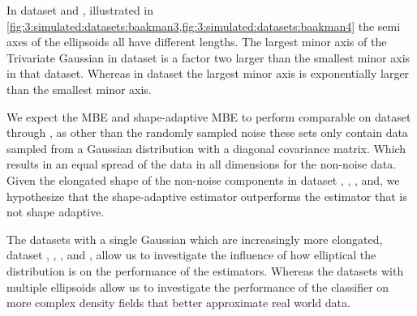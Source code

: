 In dataset \numberstringnum{\baakmanFourNum} and \numberstringnum{\baakmanFiveNum}, illustrated in \cref{fig:3:simulated:datasets:baakman3,fig:3:simulated:datasets:baakman4} the semi axes of the ellipsoids all have different lengths. The largest minor axis of the Trivariate Gaussian in dataset \numberstringnum{\baakmanFourNum} is a factor two larger than the smallest minor axis in that dataset. Whereas in dataset \numberstringnum{\baakmanFiveNum} the largest minor axis is exponentially larger than the smallest minor axis. 

We expect the MBE and shape-adaptive MBE to perform comparable on dataset \numberstringnum{\ferdosiOneNum} through \numberstringnum{\ferdosiThreeNum}, as other than the randomly sampled noise these sets only contain data sampled from a Gaussian distribution with a diagonal covariance matrix. Which results in an equal spread of the data in all dimensions for the non-noise data. 
Given the elongated shape of the non-noise components in dataset \numberstringnum{\baakmanOneNum}, \numberstringnum{\baakmanTwoNum}, \numberstringnum{\baakmanThreeNum}, \numberstringnum{\baakmanFourNum} and, \numberstringnum{\baakmanFiveNum} we hypothesize that the shape-adaptive estimator outperforms the estimator that is not shape adaptive.

The datasets with a single Gaussian which are increasingly more elongated, \ie dataset \ferdosiOne, \baakmanOne, \baakmanFour, and \baakmanFive, allow us to investigate the influence of how elliptical the distribution is on the performance of the estimators. Whereas the datasets with multiple ellipsoids allow us to investigate the performance of the classifier on more complex density fields that better approximate real world data. 